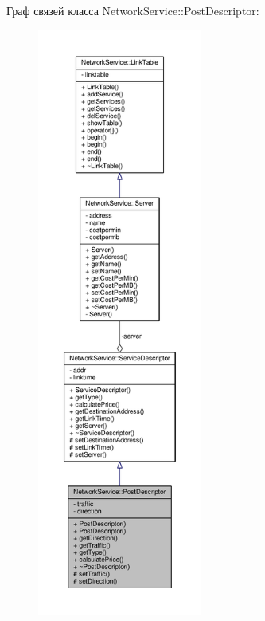 Граф связей класса Network\+Service\+:\+:Post\+Descriptor\+:
\nopagebreak
\begin{figure}[H]
\begin{center}
\leavevmode
\includegraphics[height=550pt]{class_network_service_1_1_post_descriptor__coll__graph}
\end{center}
\end{figure}
